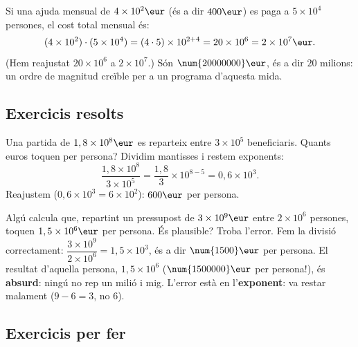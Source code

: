 \begin{exemple}
Si una ajuda mensual de $4\times 10^{2}\eur$ (és a dir $400\eur$) es paga a
$5\times 10^{4}$ persones, el cost total mensual és:
\[
(4\times 10^{2})\cdot(5\times 10^{4})=(4\cdot 5)\times 10^{2+4}
=20\times 10^{6}=2\times 10^{7}\eur.
\]
(Hem reajustat $20\times 10^{6}$ a $2\times 10^{7}$.) Són $\num{20000000}\eur$, és a
dir $20$ milions: un ordre de magnitud creïble per a un programa d'aquesta mida.
\end{exemple}

\subsection{Exercicis resolts}

\begin{exresolt}
Una partida de $1,8\times 10^{8}\eur$ es reparteix entre $3\times 10^{5}$
beneficiaris. Quants euros toquen per persona?
\solucio
Dividim mantisses i restem exponents:
\[
\frac{1,8\times 10^{8}}{3\times 10^{5}}=\frac{1,8}{3}\times 10^{8-5}
=0,6\times 10^{3}.
\]
Reajustem ($0,6\times 10^{3}=6\times 10^{2}$): $600\eur$ per persona.
\end{exresolt}

\begin{exresolt}
Algú calcula que, repartint un pressupost de $3\times 10^{9}\eur$ entre $2\times 10^{6}$
persones, toquen $1,5\times 10^{6}\eur$ per persona. És plausible? Troba l'error.
\solucio
Fem la divisió correctament: $\dfrac{3\times 10^{9}}{2\times 10^{6}}=1,5\times 10^{3}$,
és a dir $\num{1500}\eur$ per persona. El resultat d'aquella persona, $1,5\times 10^{6}$
($\num{1500000}\eur$ per persona!), és \textbf{absurd}: ningú no rep un milió i mig.
L'error està en l'\textbf{exponent}: va restar malament ($9-6=3$, no $6$).
\end{exresolt}

\subsection{Exercicis per fer}

